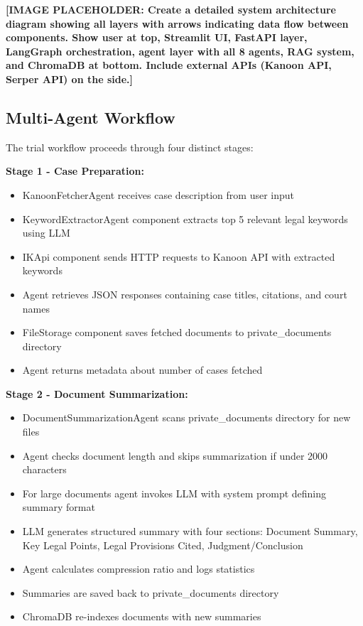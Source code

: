 \documentclass[12pt,singleside,a4paper]{article}
\begin{document}
\textbf{[IMAGE PLACEHOLDER: Create a detailed system architecture diagram showing all layers with arrows indicating data flow between components. Show user at top, Streamlit UI, FastAPI layer, LangGraph orchestration, agent layer with all 8 agents, RAG system, and ChromaDB at bottom. Include external APIs (Kanoon API, Serper API) on the side.]}

\subsection{Multi-Agent Workflow}
The trial workflow proceeds through four distinct stages:

\textbf{Stage 1 - Case Preparation:}
\begin{itemize}
\item KanoonFetcherAgent receives case description from user input
\item KeywordExtractorAgent component extracts top 5 relevant legal keywords using LLM
\item IKApi component sends HTTP requests to Kanoon API with extracted keywords
\item Agent retrieves JSON responses containing case titles, citations, and court names
\item FileStorage component saves fetched documents to private\_documents directory
\item Agent returns metadata about number of cases fetched
\end{itemize}

\textbf{Stage 2 - Document Summarization:}
\begin{itemize}
\item DocumentSummarizationAgent scans private\_documents directory for new files
\item Agent checks document length and skips summarization if under 2000 characters
\item For large documents agent invokes LLM with system prompt defining summary format
\item LLM generates structured summary with four sections: Document Summary, Key Legal Points, Legal Provisions Cited, Judgment/Conclusion
\item Agent calculates compression ratio and logs statistics
\item Summaries are saved back to private\_documents directory
\item ChromaDB re-indexes documents with new summaries
\end{itemize}
\end{document}
